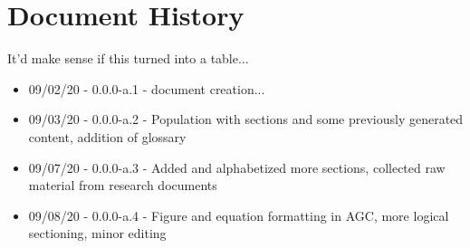 \chapter{Document History}
It'd make sense if this turned into a table...

\begin{itemize}
\item 09/02/20 - 0.0.0-a.1 - document creation...
\item 09/03/20 - 0.0.0-a.2 - Population with sections and some previously generated content, addition of glossary
\item 09/07/20 - 0.0.0-a.3 - Added and alphabetized more sections, collected raw material from research documents
\item 09/08/20 - 0.0.0-a.4 - Figure and equation formatting in AGC, more logical sectioning, minor editing
\end{itemize}